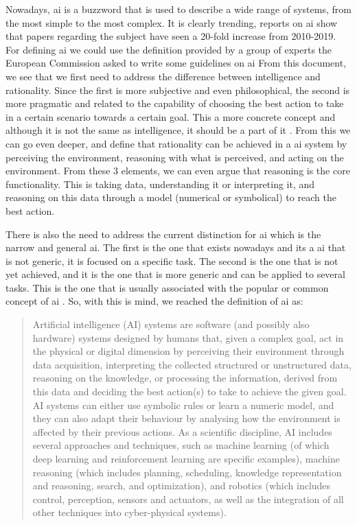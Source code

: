 Nowadays, \ac{ai} is a buzzword that is used to describe a wide range of systems, from the most simple to the most complex. It is clearly trending, reports on \ac{ai} show that papers regarding the subject have seen a 20-fold increase from 2010-2019.
For defining \ac{ai} we could use the definition provided by a group of experts the European Commission asked to write some guidelines on \ac{ai} \cite{DefinitionAIMain2019}
From this document, we see that we first need to address the difference between intelligence and rationality. Since the first is more subjective and even philosophical, the second is more pragmatic and related to the capability of choosing the best action to take in a certain scenario towards a certain goal. This a more concrete concept and although it is not the same as intelligence, it should be a part of it \cite{DefinitionAIMain2019,DBLP:books/aw/RN2020}.
From this we can go even deeper, and define that rationality can be achieved in a \ac{ai} system by perceiving the environment, reasoning with what is perceived, and acting on the environment. From these 3 elements, we can even argue that reasoning is the core functionality. This is taking data, understanding it or interpreting it, and reasoning on this data through a model (numerical or symbolical) to reach the best action.

There is also the need to address the current distinction for \ac{ai} which is the narrow and general \ac{ai}. The first is the one that exists nowadays and its a \ac{ai} that is not generic, it is focused on a specific task. The second is the one that is not yet achieved, and it is the one that is more generic and can be applied to several tasks. This is the one that is usually associated with the popular or common concept of \ac{ai} \cite{DefinitionAIMain2019,DBLP:books/aw/RN2020}. So, with this is mind, we reached the definition of \ac{ai} as:
\begin{quote}
    Artificial intelligence (AI) systems are software (and possibly also hardware) systems designed by humans that, given a complex goal, act in the physical or digital dimension by perceiving their environment through data acquisition, interpreting the collected structured or unstructured data, reasoning on the knowledge, or processing the information, derived from this data and deciding the best action(s) to take to achieve the given goal. AI systems can either use symbolic rules or learn a numeric model, and they can also adapt their behaviour by analysing how the environment is affected by their previous actions. As a scientific discipline, AI includes several approaches and techniques, such as machine learning (of which deep learning and reinforcement learning are specific examples), machine reasoning (which includes planning, scheduling, knowledge representation and reasoning, search, and optimization), and robotics (which includes control, perception, sensors and actuators, as well as the integration of all other techniques into cyber-physical systems). \cite{DefinitionAIMain2019}
    \end{quote}

